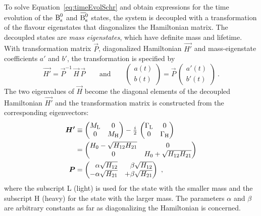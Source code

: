 To solve Equation~\ref{eq:timeEvolSchr} and obtain expressions for the time evolution of the $\text{B}_\text{s}^0$ and $\Bsbar$ states, the system is
decoupled with a transformation of the flavour eigenstates that diagonalizes the Hamiltonian matrix. The decoupled states are \emph{mass
eigenstates}, which have definite mass and lifetime. With transformation matrix $\vec{P}$, diagonalized Hamiltonian $\vec{H'}$ and
mass-eigenstate coefficients $a'$ and $b'$, the transformation is specified by
\begin{equation}
  \label{eq:timeEvolTrans}
  \vec{H'} = \vec{P}^{-1}\,\vec{H}\,\vec{P}
  \qquad \text{and} \qquad
  \begin{pmatrix} a(t) \\ b(t) \end{pmatrix}
    = \vec{P}\, \begin{pmatrix} a'(t) \\ b'(t) \end{pmatrix}
  \ .
\end{equation}
The two eigenvalues of $\vec{H}$ become the diagonal elements of the decoupled Hamiltonian $\vec{H'}$ and the transformation matrix is
constructed from the corresponding eigenvectors:
\begin{subequations}
  \label{eq:timeEvolMassStates}
  \begin{align}
    \vec{H'} &\equiv \begin{pmatrix} \mL & 0 \\ 0 & \mH \end{pmatrix}
             - \tfrac{i}{2}\, \begin{pmatrix} \GamL & 0 \\ 0 & \GamH \end{pmatrix}
    \label{eq:timeEvolMassStatesHamil1} \\
    &= \begin{pmatrix} H_0 - \sqrt{H_{12} H_{21}} & 0 \\ 0 & H_0 + \sqrt{H_{12} H_{21}} \end{pmatrix}
    \label{eq:timeEvolMassStatesHamil2} \\
    \vec{P}  &= \begin{pmatrix*}[r]
                   \alpha\sqrt{H_{12}} &  \beta\sqrt{H_{12}} \\
                  -\alpha\sqrt{H_{21}} & +\beta\sqrt{H_{21}}
                \end{pmatrix*}
    \label{eq:timeEvolMassTrans}
    \ ,
  \end{align}
\end{subequations}
where the subscript L (light) is used for the state with the smaller mass and the subscript H (heavy) for the state with the larger mass.
The parameters $\alpha$ and $\beta$ are arbitrary constants as far as diagonalizing the Hamiltonian is concerned.

